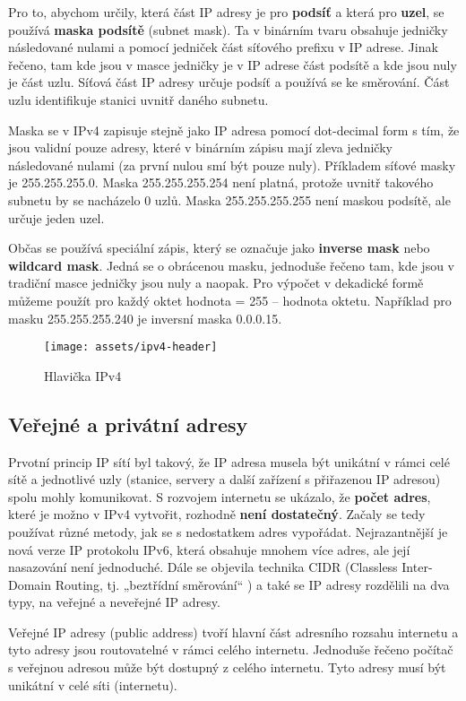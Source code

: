 Pro to, abychom určily, která část IP adresy je pro \textbf{podsíť} a která pro \textbf{uzel}, se používá \textbf{maska podsítě} (subnet mask). Ta v binárním tvaru obsahuje jedničky následované nulami a pomocí jedniček část síťového prefixu v IP adrese. Jinak řečeno, tam kde jsou v masce jedničky je v IP adrese část podsítě a kde jsou nuly je část uzlu. Síťová část IP adresy určuje podsíť a používá se ke směrování. Část uzlu identifikuje stanici uvnitř daného subnetu.

Maska se v IPv4 zapisuje stejně jako IP adresa pomocí dot-decimal form s tím, že jsou validní pouze adresy, které v binárním zápisu mají zleva jedničky následované nulami (za první nulou smí být pouze nuly). Příkladem síťové masky je 255.255.255.0. Maska 255.255.255.254 není platná, protože uvnitř takového subnetu by se nacházelo 0 uzlů. Maska 255.255.255.255 není maskou podsítě, ale určuje jeden uzel.

Občas se používá speciální zápis, který se označuje jako \textbf{inverse mask} nebo \textbf{wildcard mask}. Jedná se o obrácenou masku, jednoduše řečeno tam, kde jsou v tradiční masce jedničky jsou nuly a naopak. Pro výpočet v dekadické formě můžeme použít pro každý oktet hodnota = 255 – hodnota oktetu. Například pro masku 255.255.255.240 je inversní maska 0.0.0.15.

\begin{figure}[H]
    \centering
    \texttt{[image: assets/ipv4-header]}
    \caption{Hlavička IPv4}
\end{figure}

\subsection{Veřejné a privátní adresy}
Prvotní princip IP sítí byl takový, že IP adresa musela být unikátní v rámci celé sítě a jednotlivé uzly (stanice, servery a další zařízení s přiřazenou IP adresou) spolu mohly komunikovat. S rozvojem internetu se ukázalo, že \textbf{počet adres}, které je možno v IPv4 vytvořit, rozhodně \textbf{není dostatečný}. Začaly se tedy používat různé metody, jak se  s nedostatkem adres vypořádat. Nejrazantnější je nová verze IP protokolu IPv6, která obsahuje mnohem více adres, ale její nasazování není jednoduché. Dále se objevila technika CIDR (Classless Inter-Domain Routing, tj. „beztřídní směrování“ ) a také se IP adresy rozdělili na dva typy, na veřejné a neveřejné IP adresy.

Veřejné IP adresy (public address) tvoří hlavní část adresního rozsahu internetu a tyto adresy jsou routovatelné v rámci celého internetu. Jednoduše řečeno počítač s veřejnou adresou může být dostupný z celého internetu. Tyto adresy musí být unikátní v celé síti (internetu).

